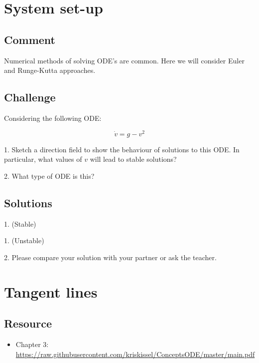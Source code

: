 \section{System set-up}

\subsection*{Comment}
Numerical methods of solving ODE's are common. Here we will consider Euler and Runge-Kutta approaches.

\subsection*{Challenge}

Considering the following ODE:

\begin{equation}
    \dot{v} = g - v^2
\end{equation}

1. Sketch a direction field to show the behaviour of solutions to this ODE. In particular, what values of $v$ will lead to stable solutions?

2. What type of ODE is this?

\subsection*{Solutions}
1. (Stable)\\

1. (Unstable)\\

2. Please compare your solution with your partner or ask the teacher.




\newpage
\section{Tangent lines}

\subsection*{Resource}
\begin{itemize}
    \item Chapter 3: \url{https://raw.githubusercontent.com/kriskissel/ConceptsODE/master/main.pdf}
\end{itemize}

